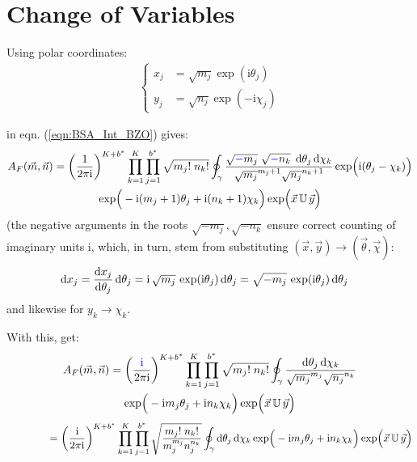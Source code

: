 \documentclass[
	english,
	a4paper,
	fontsize=10pt,
	parskip=half,
	titlepage=true,
	DIV=12,
	final
]{scrreprt}
\newcommand*{\iunit}{\ensuremath{\mathrm{i}}}
\begin{document}
\section{Change of Variables}
Using polar coordinates:
\begin{align}
	\begin{cases}
	x_j &= \sqrt{m_j} \exp( \iunit \theta_j) \\
	y_j &= \sqrt{n_j} \exp(-\iunit \chi  _j)
	\end{cases}
	\label{eqn:DefXY}
\end{align}

in eqn. (\ref{eqn:BSA_Int_BZO}) gives:
\begin{multline}
	A_F(\vec{m}, \vec{n})
=
	\qty(
		\frac{1}{2\pi\iunit}
	)^{K + b^*}
	\prod_{k=1}^{K}
	\prod_{j=1}^{b^*}
		\sqrt{m_j! \; n_k!}
		\oint_{\gamma}
			\frac
				{ \sqrt{{\color{blue}-}m_j} \; \sqrt{{\color{blue}-}n_k} \; \dd{\theta_j} \dd{\chi_k}}
				{\sqrt{m_j}^{m_j+1}  \sqrt{n_j}^{n_k+1}}
			\exp( \Big. \iunit(\theta_j - \chi_k))
\\
	\exp(
		\Big.
		-\iunit (m_j + 1) \theta_j
		+\iunit (n_k + 1) \chi  _k
	)
	\exp( \Big. \vec{x} \, \mathbb{U} \, \vec{y})
\end{multline}
(the negative arguments in the roots $\sqrt{-m_j}, \sqrt{-n_k}$ ensure correct counting of imaginary units $\iunit$, which, in turn, stem from substituting 
$(\vec{x}, \vec{y}) \to (\vec{\theta}, \vec{\chi})$:
\begin{align}
	\dd{x_j}
&=
	\dv{x_j}{\theta_j} \dd{\theta_j}
=
	\iunit \, \sqrt{m_j} \, \exp(\iunit \theta_j) \dd{\theta_j}
=
	\sqrt{-m_j} \, \exp(\iunit \theta_j) \dd{\theta_j}
\end{align}
and likewise for $y_k \to \chi_k$.

With this, get:
\begin{multline}
	A_F(\vec{m}, \vec{n})
=
	\qty(
		\frac{{\color{blue}\iunit}}{2\pi\iunit}
	)^{K + b^*}
	\prod_{k=1}^{K}
	\prod_{j=1}^{b^*}
		\sqrt{m_j! \; n_k!}
		\oint_{\gamma}
			\frac
				{\dd{\theta_j} \dd{\chi_k}}
				{\sqrt{m_j}^{m_j}  \sqrt{n_j}^{n_k}}
\\
	\exp(
		\Big.
		-\iunit m_j \theta_j
		+\iunit n_k \chi  _k
	)
	\exp( \Big. \vec{x} \, \mathbb{U} \, \vec{y})
\end{multline}
\begin{multline}
	\qquad\qquad
=
	\qty(
		\frac{\iunit}{2\pi\iunit}
	)^{K + b^*}
	\prod_{k=1}^{K}
	\prod_{j=1}^{b^*}
		\sqrt{\frac
			{m_j! \; n_k!}
			{m_j^{m_j}  n_j^{n_k}}
		}
		\oint_{\gamma}
			\dd{\theta_j} \dd{\chi_k}
	\exp(
		\Big.
		-\iunit m_j \theta_j
		+\iunit n_k \chi  _k
	)
	\exp( \Big. \vec{x} \, \mathbb{U} \, \vec{y})
\end{multline}
\end{document}

